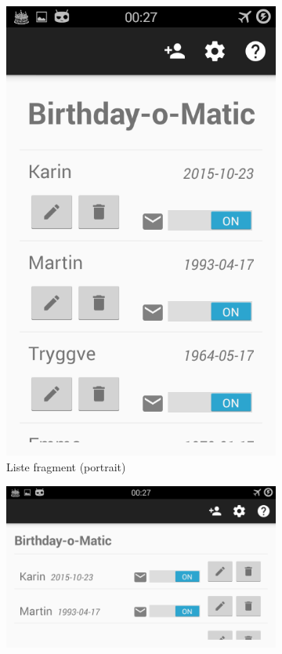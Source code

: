 \begin{figure}[ht]
    \centering
    \begin{subfigure}[b]{0.35\textwidth}
        \includegraphics[width=\textwidth]{./img/5.png}
        \caption{Liste fragment (portrait)}
        \label{fig:liste_fragment_p}
    \end{subfigure}
    \begin{subfigure}[b]{0.6\textwidth}
        \includegraphics[width=\textwidth]{./img/6.png}

\end{subfigure}
\end{figure}
